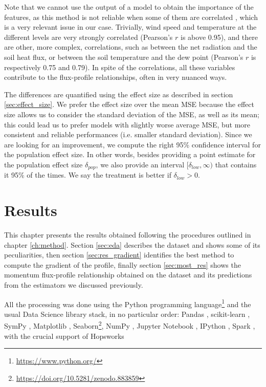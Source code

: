 \documentclass[a4paper]{book}
\begin{document}
Note that we cannot use the output of a model to obtain the importance of the features, as this method is not reliable when some of them are correlated \citep{rf_bias,rf_corr_imp}, which is a very relevant issue in our case. Trivially, wind speed and temperature at the different levels are very strongly correlated (Pearson's $r$ is above 0.95), and there are other, more complex, correlations, such as between the net radiation and the soil heat flux, or between the soil temperature and the dew point (Pearson's $r$ is respectively 0.75 and 0.79). In spite of the correlations, all these variables contribute to the flux-profile relationships, often in very nuanced ways.

The differences are quantified using the effect size as described in section \ref{sec:effect_size}. We prefer the effect size over the mean MSE because the effect size allows us to consider the standard deviation of the MSE, as well as its mean; this could lead us to prefer models with slightly worse average MSE, but more consistent and reliable performances (i.e. smaller standard deviation). Since we are looking for an improvement, we compute the right 95\% confidence interval for the population effect size. In other words, besides providing a point estimate for the population effect size $\delta_{pop}$, we also provide an interval $[\delta_{low}, \infty)$ that contains it 95\% of the times. We say the treatment is better if $\delta_{low}>0$.

\chapter{Results}
\label{ch:results}

This chapter presents the results obtained following the procedures outlined in chapter \ref{ch:method}. Section \ref{sec:eda} describes the dataset and shows some of its peculiarities, then section \ref{sec:res_gradient} identifies the best method to compute the gradient of the profile, finally section \ref{sec:most_res} shows the momentum flux-profile relationship obtained on the dataset and its predictions from the estimators we discussed previously.

All the processing was done using the Python programming language\footnote{\url{https://www.python.org/}} and the usual Data Science library stack, in no particular order: Pandas \citep{pandas}, scikit-learn \citep{sklearn}, SymPy \citep{sympy}, Matplotlib \citep{matplotlib}, Seaborn\footnote{\url{https://doi.org/10.5281/zenodo.883859}}, NumPy \citep{numpy}, Jupyter Notebook \citep{jupyter}, IPython \citep{ipython}, Spark \citep{spark}, with the crucial support of Hopsworks \citep{hops}
\end{document}
